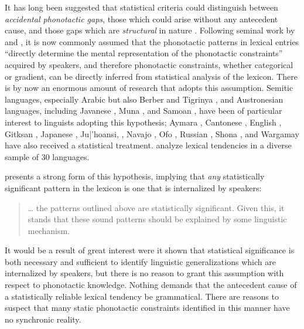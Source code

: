 \label{turkish}

It has long been suggested that statistical criteria could distinguish between \emph{accidental phonotactic gaps}, those which could arise without any antecedent cause, and those gaps which are \emph{structural} in nature \citep[e.g.,][]{Fischer-Jorgensen1952,Saporta1955,Saporta1958,Vogt1954}.
Following seminal work by \citet{Mester1988} and \citet{McCarthy1988}, it is now commonly assumed that the phonotactic patterns in lexical entries ``directly determine the mental representation of the phonotactic constraints'' \citep[180]{Frisch2004} acquired by speakers, and therefore phonotactic constraints, whether categorical or gradient, can be directly inferred from statistical analysis of the lexicon.
There is by now an enormous amount of research that adopts this assumption.
Semitic languages, especially Arabic \citep{Coetzee2008a,Frisch2004,McCarthy1988,Pierrehumbert1993} but also Berber \citep{Elmedlaoui1995} and Tigrinya \citep{Buckley1997}, and Austronesian languages, including Javanese \citep{GraffInPress,Mester1988}, Muna \citep{Anttila2008a,Coetzee2008a}, and Samoan \citep{AldereteInPress}, have been of particular interest to linguists adopting this hypothesis; Aymara \citep{GraffInPress}, Cantonese \citep{Yip1989}, English \citep{Berkley1994a,Berkley1994b,Berkley2000,Coetzee2008b,Martin2007,Martin2011}, Gitksan \citep{Brown2010}, Japanese \citep{Kawahara2006}, Ju|'hoansi, \citep{Kinney2005}, Navajo \citep{Martin2007,Martin2011}, Ofo \citep[38f.]{MacEachern1999}, Russian \citep{Padgett1991,Padgett1992}, Shona \citep{Hayes2008a}, and Wargamay \citep{Hayes2008a} have also received a statistical treatment. 
\citet{Pozdniakov2007} analyze lexical tendencies in a diverse sample of 30 languages.

\citet{Brown2010} presents a strong form of this hypothesis, implying that \emph{any} statistically significant pattern in the lexicon is one that is internalized by speakers:

\begin{quote}
\ldots{} the patterns outlined above are statistically significant. Given this, it stands that these sound patterns should be explained by some linguistic mechanism. \citep[][48]{Brown2010}
\end{quote}

It would be a result of great interest were it shown that statistical significance is both necessary and sufficient to identify linguistic generalizations which are internalized by speakers, but there is no reason to grant this assumption with respect to phonotactic knowledge.
Nothing demands that the antecedent cause of a statistically reliable lexical tendency be grammatical. 
There are reasons to suspect that many static phonotactic constraints identified in this manner have no synchronic reality.


